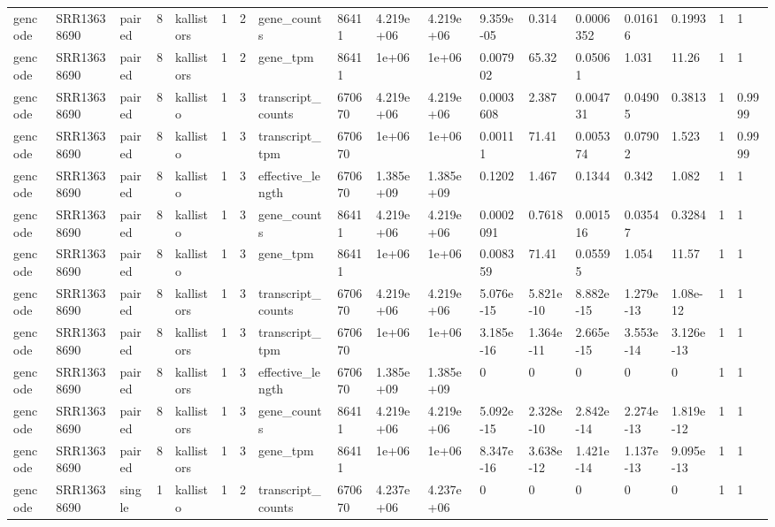 \begin{tabular}{llllllllllllllllll}
gencode & SRR13638690 & paired & 8 & kallistors & 1 & 2 & gene\_counts & 86411 & 4.219e+06 & 4.219e+06 & 9.359e-05 & 0.314 & 0.0006352 & 0.01616 & 0.1993 & 1 & 1 \\
gencode & SRR13638690 & paired & 8 & kallistors & 1 & 2 & gene\_tpm & 86411 & 1e+06 & 1e+06 & 0.007902 & 65.32 & 0.05061 & 1.031 & 11.26 & 1 & 1 \\
gencode & SRR13638690 & paired & 8 & kallisto & 1 & 3 & transcript\_counts & 670670 & 4.219e+06 & 4.219e+06 & 0.0003608 & 2.387 & 0.004731 & 0.04905 & 0.3813 & 1 & 0.9999 \\
gencode & SRR13638690 & paired & 8 & kallisto & 1 & 3 & transcript\_tpm & 670670 & 1e+06 & 1e+06 & 0.00111 & 71.41 & 0.005374 & 0.07902 & 1.523 & 1 & 0.9999 \\
gencode & SRR13638690 & paired & 8 & kallisto & 1 & 3 & effective\_length & 670670 & 1.385e+09 & 1.385e+09 & 0.1202 & 1.467 & 0.1344 & 0.342 & 1.082 & 1 & 1 \\
gencode & SRR13638690 & paired & 8 & kallisto & 1 & 3 & gene\_counts & 86411 & 4.219e+06 & 4.219e+06 & 0.0002091 & 0.7618 & 0.001516 & 0.03547 & 0.3284 & 1 & 1 \\
gencode & SRR13638690 & paired & 8 & kallisto & 1 & 3 & gene\_tpm & 86411 & 1e+06 & 1e+06 & 0.008359 & 71.41 & 0.05595 & 1.054 & 11.57 & 1 & 1 \\
gencode & SRR13638690 & paired & 8 & kallistors & 1 & 3 & transcript\_counts & 670670 & 4.219e+06 & 4.219e+06 & 5.076e-15 & 5.821e-10 & 8.882e-15 & 1.279e-13 & 1.08e-12 & 1 & 1 \\
gencode & SRR13638690 & paired & 8 & kallistors & 1 & 3 & transcript\_tpm & 670670 & 1e+06 & 1e+06 & 3.185e-16 & 1.364e-11 & 2.665e-15 & 3.553e-14 & 3.126e-13 & 1 & 1 \\
gencode & SRR13638690 & paired & 8 & kallistors & 1 & 3 & effective\_length & 670670 & 1.385e+09 & 1.385e+09 & 0 & 0 & 0 & 0 & 0 & 1 & 1 \\
gencode & SRR13638690 & paired & 8 & kallistors & 1 & 3 & gene\_counts & 86411 & 4.219e+06 & 4.219e+06 & 5.092e-15 & 2.328e-10 & 2.842e-14 & 2.274e-13 & 1.819e-12 & 1 & 1 \\
gencode & SRR13638690 & paired & 8 & kallistors & 1 & 3 & gene\_tpm & 86411 & 1e+06 & 1e+06 & 8.347e-16 & 3.638e-12 & 1.421e-14 & 1.137e-13 & 9.095e-13 & 1 & 1 \\
gencode & SRR13638690 & single & 1 & kallisto & 1 & 2 & transcript\_counts & 670670 & 4.237e+06 & 4.237e+06 & 0 & 0 & 0 & 0 & 0 & 1 & 1 \\

\end{tabular}
